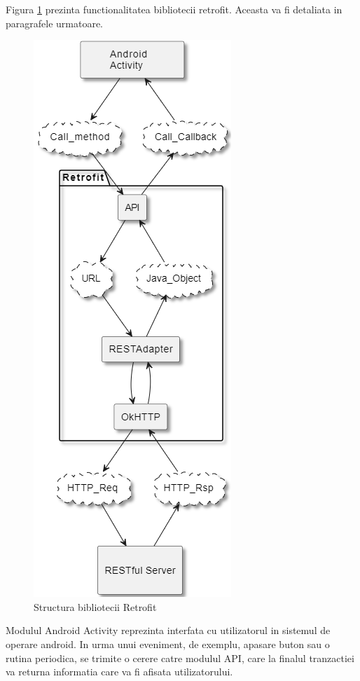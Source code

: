 Figura \ref{fig:RetrofitStructure} prezinta functionalitatea bibliotecii retrofit. Aceasta va fi detaliata in paragrafele urmatoare.
\begin{figure}[H]
    \centering
    \includegraphics[scale=0.55]{figs/RetrofitStructure.png}
    \caption{Structura bibliotecii Retrofit}
    \label{fig:RetrofitStructure}
\end{figure}

Modulul Android Activity reprezinta interfata cu utilizatorul in sistemul de operare android. In urma unui eveniment, de exemplu, apasare buton sau 
o rutina periodica, se trimite o cerere catre modulul API, care la finalul tranzactiei va returna informatia care va fi afisata utilizatorului.

